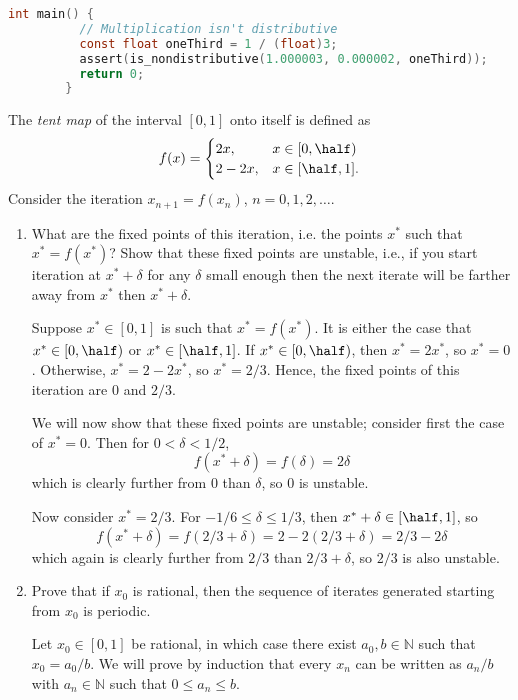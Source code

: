 \documentclass{../../../kin_math}
\begin{document}
\begin{questions}
\begin{enumerate}
\begin{solution}
\begin{lstlisting}[language=C]
        int main() {
          // Multiplication isn't distributive
          const float oneThird = 1 / (float)3;
          assert(is_nondistributive(1.000003, 0.000002, oneThird));
          return 0;
        }
      \end{lstlisting}
    \end{solution}
  \end{enumerate}

  \question The \emph{tent map} of the interval $[0, 1]$ onto itself is defined as
  \begin{equation}
    f(x) = \begin{cases} 2x, & x \in [0, \half) \\ 2 - 2x, & x \in [\half, 1]. \end{cases}
  \end{equation}
  Consider the iteration $x_{n + 1} = f(x_n)$, $n = 0, 1, 2, \dots$.
  \begin{enumerate}
    \item What are the fixed points of this iteration, i.e. the points $x^*$ such that $x^* = f(x^*)$? Show that these fixed points are unstable, i.e., if you start iteration at $x^* + \delta$ for any $\delta$ small enough then the next iterate will be farther away from $x^*$ then $x^* + \delta$.
    \begin{solution}
      Suppose $x^* \in [0, 1]$ is such that $x^* = f(x^*)$. It is either the case that $x^* \in [0, \half)$ or $x^* \in [\half, 1]$. If $x^* \in [0, \half)$, then $x^* = 2x^*$, so $x^* = 0$. Otherwise, $x^* = 2 - 2x^*$, so $x^* = 2 / 3$. Hence, the fixed points of this iteration are $0$ and $2 / 3$.

      We will now show that these fixed points are unstable; consider first the case of $x^* = 0$. Then for $0 < \delta < 1 / 2$,
      \begin{equation*}
        f(x^* + \delta) = f(\delta) = 2\delta
      \end{equation*}
      which is clearly further from $0$ than $\delta$, so $0$ is unstable.

      Now consider $x^* = 2 / 3$. For $-1 / 6 \leq \delta \leq 1 / 3$, then $x^* + \delta \in [\half, 1]$, so
      \begin{equation*}
        f(x^* + \delta) = f(2 / 3 + \delta) = 2 - 2(2 / 3 + \delta) = 2/3 - 2\delta
      \end{equation*}
      which again is clearly further from $2 / 3$ than $2 / 3 + \delta$, so $2 / 3$ is also unstable.
    \end{solution}
    \item Prove that if $x_0$ is rational, then the sequence of iterates generated starting from $x_0$ is periodic.
    \begin{solution}
      Let $x_0 \in [0, 1]$ be rational, in which case there exist $a_0, b \in \mathbb{N}$ such that $x_0 = a_0 / b$. We will prove by induction that every $x_n$ can be written as $a_n / b$ with $a_n \in \mathbb{N}$ such that $0 \leq a_n \leq b$.


\end{solution}
\end{enumerate}
\end{questions}
\end{document}
